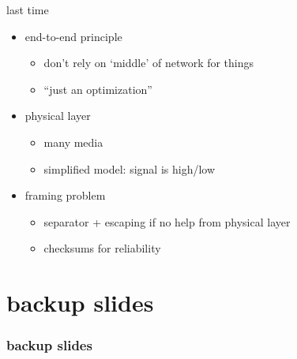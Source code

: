 \date{}
\title{}
\date{}
\usepackage{pgfplots}
\pgfplotsset{compat=1.16}

\begin{frame}
    \titlepage
\end{frame}

\begin{frame}{last time}
    \begin{itemize}
    \item end-to-end principle
        \begin{itemize}
        \item don't rely on `middle' of network for things
        \item ``just an optimization''
        \end{itemize}
    \item physical layer
        \begin{itemize}
        \item many media
        \item simplified model: signal is high/low
        \end{itemize}
    \item framing problem
        \begin{itemize}
        \item separator + escaping if no help from physical layer
        \item checksums for reliability
        \end{itemize}
    \end{itemize}
\end{frame}



\section{backup slides}
\begin{frame}\frametitle{backup slides}
\end{frame}


